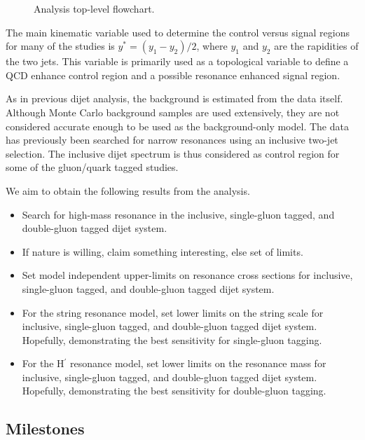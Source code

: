 \begin{figure}[htb]
\caption{Analysis top-level flowchart.}
\label{eflow}
\end{figure}

The main kinematic variable used to determine the control versus
signal regions for many of the studies is $y^* = (y_1-y_2)/2$, where
$y_1$ and $y_2$ are the rapidities of the two jets.
This variable is primarily used as a topological variable to define a QCD
enhance control region and a possible resonance enhanced signal region.

As in previous dijet analysis, the background is estimated from the
data itself.
Although Monte Carlo background samples are used extensively, they are
not considered accurate enough to be used as the background-only model.
The data has previously been searched for narrow resonances using an
inclusive two-jet selection.
The inclusive dijet spectrum is thus considered as control region for
some of the gluon/quark tagged studies. 

We aim to obtain the following results from the analysis.

\begin{itemize}
\item Search for high-mass resonance in the inclusive, single-gluon tagged,
  and double-gluon tagged dijet system.
\item If nature is willing, claim something interesting, else set of
  limits. 
\item Set model independent upper-limits on resonance cross sections for
  inclusive, single-gluon tagged, and double-gluon tagged dijet system.
\item For the string resonance model, set lower limits on the string
  scale for inclusive, single-gluon tagged, and double-gluon tagged
  dijet system. Hopefully, demonstrating the best sensitivity for
  single-gluon tagging.
\item For the H$^\prime$ resonance model, set lower limits on the
  resonance mass for inclusive, single-gluon tagged, and double-gluon
  tagged dijet system. Hopefully, demonstrating the best sensitivity
  for  double-gluon tagging.
\end{itemize}

\subsection{Milestones}

